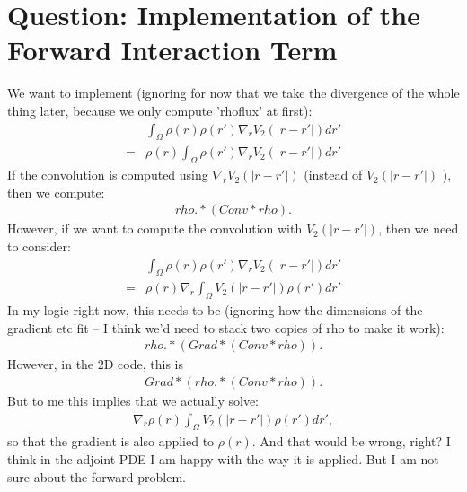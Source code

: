 \documentclass[11pt, a4paper]{article}
\theoremstyle{definition}
\begin{document}
	\section*{Question: Implementation of the Forward Interaction Term}
	We want to implement (ignoring for now that we take the divergence of the whole thing later, because we only compute 'rhoflux' at first):
	\begin{align*}
	&\int_\Omega \rho(r) \rho(r') \nabla_r V_2 (|r - r'|) dr'\\
	=&\rho(r) \int_\Omega \rho(r') \nabla_r  V_2 (|r - r'|) dr'
	\end{align*}
	If the convolution is computed using $\nabla_r V_2 (|r - r'|) $ (instead of $V_2 (|r - r'|)$ ), then we compute:
	\begin{align*}
	rho.*(Conv*rho).
	\end{align*}
	However, if we want to compute the convolution with $V_2 (|r - r'|)$, then we need to consider:
	\begin{align*}
	&\int_\Omega \rho(r) \rho(r') \nabla_r V_2 (|r - r'|) dr'\\
	=&\rho(r) \nabla_r \int_\Omega  V_2 (|r - r'|)\rho(r')  dr'
	\end{align*}
	In my logic right now, this needs to be (ignoring how the dimensions of the gradient etc fit -- I think we'd need to stack two copies of rho to make it work):
	\begin{align*}
	rho.*(Grad*(Conv*rho)).
	\end{align*}
	However, in the 2D code, this is
	\begin{align*}
	Grad*(rho.*(Conv*rho)).
	\end{align*}
	But to me this implies that we actually solve:
	\begin{align*}
	\nabla_r \rho(r)  \int_\Omega V_2 (|r - r'|) \rho(r')  dr',
	\end{align*}
	so that the gradient is also applied to $\rho(r)$. And that would be wrong, right? 
	I think in the adjoint PDE I am happy with the way it is applied. But I am not sure about the forward problem.
	
	
\end{document}
